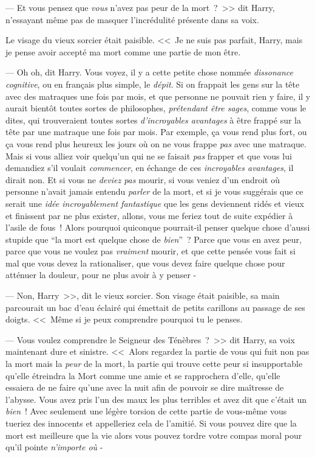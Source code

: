 --- Et vous pensez que \emph{vous} n'avez pas peur de la mort~?~>> dit Harry, n'essayant même pas de masquer l'incrédulité présente dans sa voix.

Le visage du vieux sorcier était paisible. <<~Je ne suis pas parfait, Harry, mais je pense avoir accepté ma mort comme une partie de mon être.

--- Oh oh, dit Harry. Vous voyez, il y a cette petite chose nommée \emph{dissonance cognitive}, ou en français plus simple, le \emph{dépit}. Si on frappait les gens sur la tête avec des matraques une fois par mois, et que personne ne pouvait rien y faire, il y aurait bientôt toutes sortes de philosophes, \emph{prétendant être sages}, comme vous le dites, qui trouveraient toutes sortes \emph{d'incroyables avantages} à être frappé sur la tête par une matraque une fois par mois. Par exemple, ça vous rend plus fort, ou ça vous rend plus heureux les jours où on ne vous frappe \emph{pas} avec une matraque. Mais si vous alliez voir quelqu'un qui ne se faisait \emph{pas} frapper et que vous lui demandiez s'il voulait \emph{commencer}, en échange de ces \emph{incroyables avantages}, il dirait non. Et si vous ne \emph{deviez pas} mourir, si vous veniez d'un endroit où personne n'avait jamais entendu \emph{parler} de la mort, et si je vous suggérais que ce serait une \emph{idée incroyablement fantastique} que les gens deviennent ridés et vieux et finissent par ne plus exister, allons, vous me feriez tout de suite expédier à l'asile de fous~! Alors pourquoi quiconque pourrait-il penser quelque chose d'aussi stupide que “la mort est quelque chose de \emph{bien}”~? Parce que vous en avez peur, parce que vous ne voulez pas \emph{vraiment} mourir, et que cette pensée vous fait si mal que vous devez la rationaliser, que vous devez faire quelque chose pour atténuer la douleur, pour ne plus avoir à y penser -

--- Non, Harry~>>, dit le vieux sorcier. Son visage était paisible, sa main parcourait un bac d'eau éclairé qui émettait de petits carillons au passage de ses doigts. <<~Même si je peux comprendre pourquoi tu le penses.

--- Vous voulez comprendre le Seigneur des Ténèbres~?~>> dit Harry, sa voix maintenant dure et sinistre. <<~Alors regardez la partie de vous qui fuit non pas la mort mais la \emph{peur} de la mort, la partie qui trouve cette peur si insupportable qu'elle étreindra la Mort comme une amie et se rapprochera d'elle, qu'elle essaiera de ne faire qu'une avec la nuit afin de pouvoir se dire maîtresse de l'abysse. Vous avez pris l'un des maux les plus terribles et avez dit que c'était un \emph{bien}~! Avec seulement une légère torsion de cette partie de vous-même vous tueriez des innocents et appelleriez cela de l'amitié. Si vous pouvez dire que la mort est meilleure que la vie alors vous pouvez tordre votre compas moral pour qu'il pointe \emph{n'importe où} -

